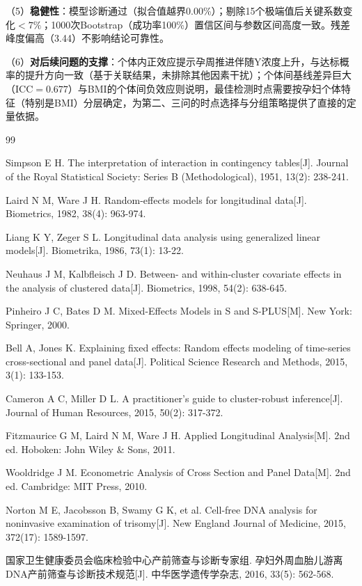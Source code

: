 \documentclass[12pt,a4paper]{ctexart}
\begin{document}
（5）\textbf{稳健性}：模型诊断通过（拟合值越界0.00\%）；剔除15个极端值后关键系数变化$<7\%$；1000次Bootstrap（成功率100\%）置信区间与参数区间高度一致。残差峰度偏高（3.44）不影响结论可靠性。

（6）\textbf{对后续问题的支撑}：个体内正效应提示孕周推进伴随Y浓度上升，与达标概率的提升方向一致（基于关联结果，未排除其他因素干扰）；个体间基线差异巨大（ICC$=0.677$）与BMI的个体间负效应则说明，最佳检测时点需要按孕妇个体特征（特别是BMI）分层确定，为第二、三问的时点选择与分组策略提供了直接的定量依据。

\begin{thebibliography}{99}
\setlength{\itemsep}{1pt}

 Simpson E H. The interpretation of interaction in contingency tables[J]. Journal of the Royal Statistical Society: Series B (Methodological), 1951, 13(2): 238-241.

 Laird N M, Ware J H. Random-effects models for longitudinal data[J]. Biometrics, 1982, 38(4): 963-974.

 Liang K Y, Zeger S L. Longitudinal data analysis using generalized linear models[J]. Biometrika, 1986, 73(1): 13-22.

 Neuhaus J M, Kalbfleisch J D. Between- and within-cluster covariate effects in the analysis of clustered data[J]. Biometrics, 1998, 54(2): 638-645.

 Pinheiro J C, Bates D M. Mixed-Effects Models in S and S-PLUS[M]. New York: Springer, 2000.

 Bell A, Jones K. Explaining fixed effects: Random effects modeling of time-series cross-sectional and panel data[J]. Political Science Research and Methods, 2015, 3(1): 133-153.

 Cameron A C, Miller D L. A practitioner's guide to cluster-robust inference[J]. Journal of Human Resources, 2015, 50(2): 317-372.

 Fitzmaurice G M, Laird N M, Ware J H. Applied Longitudinal Analysis[M]. 2nd ed. Hoboken: John Wiley \& Sons, 2011.

 Wooldridge J M. Econometric Analysis of Cross Section and Panel Data[M]. 2nd ed. Cambridge: MIT Press, 2010.

 Norton M E, Jacobsson B, Swamy G K, et al. Cell-free DNA analysis for noninvasive examination of trisomy[J]. New England Journal of Medicine, 2015, 372(17): 1589-1597.

 国家卫生健康委员会临床检验中心产前筛查与诊断专家组. 孕妇外周血胎儿游离DNA产前筛查与诊断技术规范[J]. 中华医学遗传学杂志, 2016, 33(5): 562-568.

\end{thebibliography}
\end{document}
